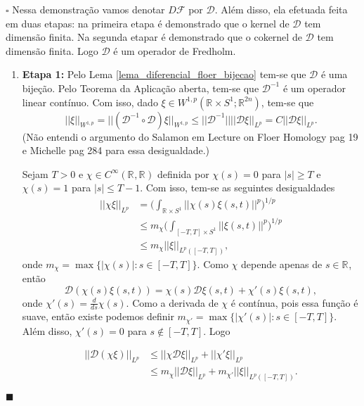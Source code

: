 \documentclass[12pt]{book}
\newenvironment{prova}[1]{$\square$ #1}{\hfill$\blacksquare$}
\newcommand{\circulo}{S^{1}}
\newcommand{\diferencialfloer}{D\operadorFloer}
\newcommand{\diferencialfloerabrev}{\mathcal{D}}
\newcommand{\derivada}[2]{\frac{d #1}{d #2}}
\newcommand{\espacosobolevcontradominio}[2]{W^{1,p}(#1;#2)}
\newcommand{\funcoessuaves}[1]{C^{\infty}(#1, \real{})}
\newcommand{\intervalofechado}[1]{[-#1,#1]}
\newcommand{\operadorFloer}{\mathcal{F}}
\newcommand{\norma}[1]{||#1||}
\newcommand{\normaLp}[1]{||#1||_{L^{p}}}
\newcommand{\normaLpdefinicao}[2]{ \Big(\int_{#2}#1^{p}\Big)^{1/p}}
\newcommand{\normaLpDominio}[2]{||#1||_{L^{p}(#2)}}
\newcommand{\normaWp}[1]{||#1||_{W^{1,p}}}
\newcommand{\retacartesianocirculo}{\real{} \times \circulo}
\newcommand{\real}[1]{\mathbb{R}^{#1}}
\newcommand{\reta}{\real{}}
\newcommand{\vermelho}[1]{{\color{red}#1}}
\begin{document}
	\begin{prova}
		Nessa demonstração vamos denotar $\diferencialfloer$ por $\diferencialfloerabrev$. Além disso, ela efetuada feita em duas etapas: na primeira etapa é demonstrado que o kernel de $\diferencialfloerabrev$ tem dimensão finita. Na segunda etapar é demonstrado que o cokernel de $\diferencialfloerabrev$ tem dimensão finita. Logo $\diferencialfloerabrev$ é um operador de Fredholm.
		
		\begin{enumerate}
			\item \textbf{Etapa 1:}
			Pelo Lema \ref{lema_diferencial_floer_bijecao} tem-se que $\diferencialfloerabrev$ é uma bijeção. Pelo Teorema da Aplicação aberta, tem-se que $\diferencialfloerabrev^{-1}$ é um operador linear contínuo. Com isso, dado $\xi \in \espacosobolevcontradominio{\retacartesianocirculo}{\real{2n}}$, tem-se que
			$$
			\normaWp{\xi} = \normaWp{(\diferencialfloerabrev^{-1}\circ\diferencialfloerabrev )\xi} \leq \norma{\diferencialfloerabrev^{-1}}\normaLp{\diferencialfloerabrev\xi}= C\normaLp{\diferencialfloerabrev\xi}.
			$$
			\vermelho{(Não entendi o argumento do Salamon em Lecture on Floer Homology pag 19 e Michelle pag 284 para essa desigualdade.)}
			
			Sejam $T>0$ e $\chi \in \funcoessuaves{\reta}$ definida por $\chi(s)=0$ para $|s|\geq T$ e $\chi(s)=1$ para $|s|\leq T-1$. Com isso, tem-se as seguintes desigualdades
			$$
			\begin{aligned}
			\normaLp{\chi\xi} 
			&=\normaLpdefinicao{\norma{\chi(s)\xi(s,t)}}{\retacartesianocirculo}
			\\
			&\leq m_{\chi} \normaLpdefinicao{\norma{\xi(s,t)}}{\intervalofechado{T}\times \circulo} 
			\\
			&\leq m_{\chi} \normaLpDominio{\xi}{\intervalofechado{T}},
			\end{aligned}
			$$	
			onde $ m_{\chi} = \max\{|\chi(s)|: s\in \intervalofechado{T} \}$. Como $\chi$ depende apenas de $s\in \reta$, então
			$$
			\diferencialfloerabrev(\chi(s)\xi(s,t)) = \chi(s)\diferencialfloerabrev\xi(s,t) +  \chi'(s)\xi(s,t),
			$$
			onde $\chi'(s)=\derivada{}{s}\chi(s)$. Como a derivada de $\chi$ é contínua, pois essa função é suave, então existe podemos definir $m_{\chi'} = \max\{|\chi'(s)|: s\in \intervalofechado{T} \}$. Além disso, $\chi'(s)=0$ para $s \notin 
			\intervalofechado{T}$. Logo
			
			$$
			\begin{aligned}
			\normaLp{\diferencialfloerabrev(\chi\xi)} 
			&\leq \normaLp{\chi\diferencialfloerabrev \xi} +\normaLp{\chi'\xi} 
			\\
			&\leq m_{\chi}\normaLp{\diferencialfloerabrev \xi} +	m_{\chi'}\normaLpDominio{\xi}{\intervalofechado{T}}.
			\end{aligned}
			$$	
			

\end{enumerate}
\end{prova}
\end{document}
